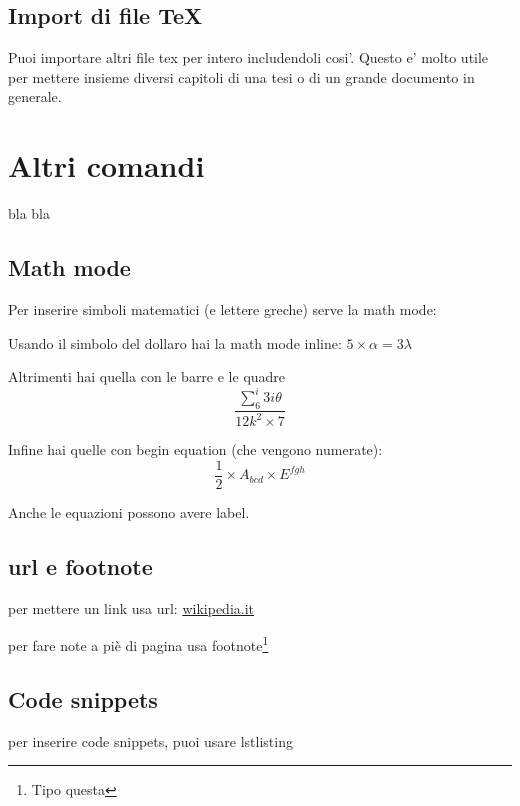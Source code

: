 \documentclass[12pt,a4paper,twoside]{book}
\begin{document}

\section{Import di file TeX}
Puoi importare altri file tex per intero includendoli cosi'.
Questo e' molto utile per mettere insieme diversi capitoli di una tesi o di un grande documento in generale.



\chapter{Altri comandi}
bla bla
\section{Math mode}
Per inserire simboli matematici (e lettere greche) serve la math mode:

Usando il simbolo del dollaro hai la math mode inline: $5 \times \alpha = 3\lambda$

Altrimenti hai quella con le barre e le quadre \[ \frac{\sum_6^i 3i\theta}{12k^2\times 7}\]

Infine hai quelle con begin equation (che vengono numerate):
\begin{equation}
    \frac{1}{2}\times A_{bcd}\times E^{fgh}
\end{equation}

Anche le equazioni possono avere label.
\section{url e footnote}
per mettere un link usa url: \url{wikipedia.it}

per fare note a piè di pagina usa footnote\footnote{Tipo questa}

\section{Code snippets}
per inserire code snippets, puoi usare lstlisting
\end{document}
